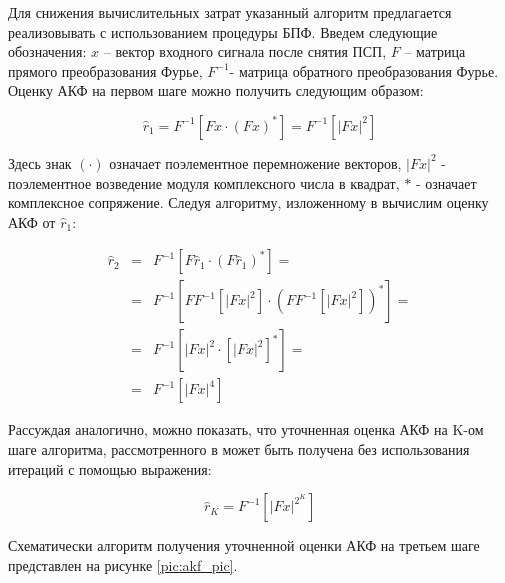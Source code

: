 Для снижения вычислительных затрат указанный алгоритм предлагается реализовывать с использованием процедуры БПФ. 
Введем следующие обозначения: ${x}$ – вектор входного сигнала после снятия ПСП, ${F}$ – матрица прямого преобразования Фурье, ${F^{-1}}$- матрица обратного преобразования Фурье.
Оценку АКФ на первом шаге можно получить следующим образом:

\begin{center}
\begin{equation}
	\label{eq:akf_1}
	\hat{r}_1 = F^{-1}\left[ Fx \cdot (Fx)^* \right] = F^{-1} \left[ \left| Fx \right| ^2 \right]
\end{equation}
\end{center}

Здесь знак ${(\cdot)}$  означает поэлементное перемножение векторов, ${\left| Fx \right| ^2}$ - поэлементное возведение модуля комплексного числа в квадрат, ${*}$ - означает
комплексное сопряжение.  Следуя алгоритму, изложенному в \cite{ostanin_akf} вычислим оценку АКФ от ${\hat{r}_1}$:

\begin{center}
\begin{eqnarray}
	\label{eq:akf_2}
	\hat{r}_2 & = & F^{-1}\left[ F \hat{r}_1 \cdot (F \hat{r}_1)^* \right] = \nonumber \\
		& = & F^{-1}	\left[ 
				FF^{-1} \left[
						\left| Fx \right| ^2
					\right]
						\cdot \left( FF^{-1} \left[ \left| Fx \right| ^2 \right]
					\right) ^*
			\right] = \nonumber \\
		& = & F^{-1} \left[ \left| Fx \right| ^2 \cdot \left[ \left| Fx \right| ^2 \right] ^* \right] =  \nonumber \\
		& = & F^{-1} \left[ \left| Fx \right| ^4 \right]
\end{eqnarray}
\end{center}

Рассуждая аналогично, можно показать, что уточненная оценка АКФ на K-ом шаге алгоритма, рассмотренного в \cite{ostanin_akf}
может быть получена без использования итераций с помощью выражения:

\begin{center}
\begin{equation}
	\label{eq:akf_3}
	\hat{r}_K = F^{-1}\left[ \left| Fx \right| ^{2^K} \right]
\end{equation}
\end{center}

Схематически алгоритм получения уточненной оценки АКФ на третьем шаге представлен на рисунке \ref{pic:akf_pic}.

